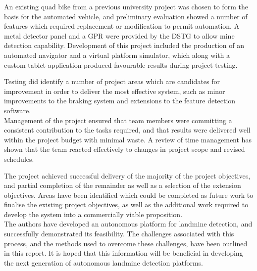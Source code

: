 \documentclass[main.tex]{subfiles}
\begin{document}
An existing quad bike from a previous university project was chosen to form the basis for the automated vehicle, and preliminary evaluation showed a number of features which required replacement or modification to permit automation. 
A metal detector panel and a GPR were provided by the DSTG to allow mine detection capability. 
Development of this project included the production of an automated navigator and a virtual platform simulator, which along with a custom tablet application produced favourable results during project testing.

Testing did identify a number of project areas which are candidates for improvement in order to deliver the most effective system, such as minor improvements to the braking system and extensions to the feature detection software.\\

Management of the project ensured that team members were committing a consistent contribution to the tasks required, and that results were delivered well within the project budget with minimal waste. 
A review of time management has shown that the team reacted effectively to changes in project scope and revised schedules.

The project achieved successful delivery of the majority of the project objectives, and partial completion of the remainder as well as a selection of the extension objectives. Areas have been identified which could be completed as future work to finalise the existing project objectives, as well as the additional work required to develop the system into a commercially viable proposition.\\

The authors have developed an autonomous platform for landmine detection, and successfully demonstrated its feasibility. The challenges associated with this process, and the methods used to overcome these challenges, have been outlined in this report. It is hoped that this information will be beneficial in developing the next generation of autonomous landmine detection platforms.  
\end{document}
